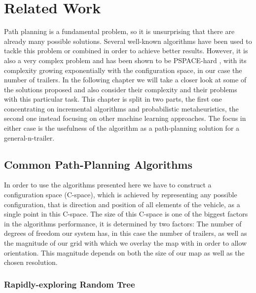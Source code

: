 \chapter{Related Work}
\label{cha:related_work}

Path planning is a fundamental problem, so it is unsurprising that there are already many possible solutions. Several well-known algorithms have been used to tackle this problem or combined in order to achieve better results. However, it is also a very complex problem and has been shown to be PSPACE-hard \cite{39}, with its complexity growing exponentially with the configuration space, in our case the number of trailers\cite{1}. In the following chapter we will take a closer look at some of the solutions proposed and also consider their complexity and their problems with this particular task. This chapter is split in two parts, the first one concentrating on incremental algorithms and probabilistic metaheuristics, the second one instead focusing on other machine learning approaches. The focus in either case is the usefulness of the algorithm as a path-planning solution for a general-n-trailer. \pagebreak[4]

\section{Common Path-Planning Algorithms}
\label{sec:common_pathplanning}

In order to use the algorithms presented here we have to construct a configuration space (C-space), which is achieved by representing any possible configuration, that is direction and position of all elements of the vehicle, as a single point in this C-space. The size of this C-space is one of the biggest factors in the algorithms performance, it is determined by two factors: The number of degrees of freedom our system has, in this case the number of trailers, as well as the magnitude of our grid with which we overlay the map with in order to allow orientation. This magnitude depends on both the size of our map as well as the chosen resolution.

\subsection{Rapidly-exploring Random Tree}
\label{sec:rrt}


